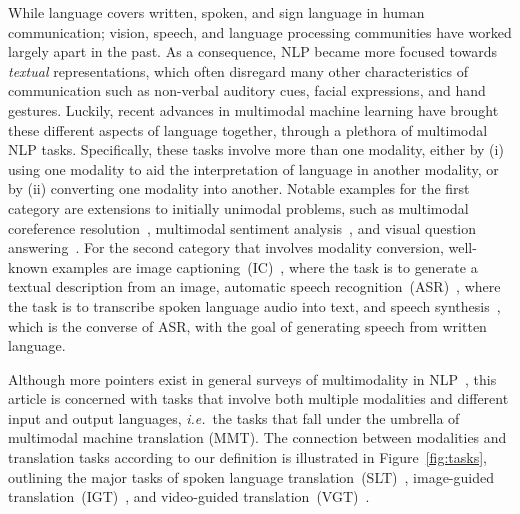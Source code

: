 \documentclass{svjour3}
\newcommand{\ie}[1]{\textit{i.e.}~#1}
\begin{document}
    While language covers written, spoken, and sign language in human communication; vision, speech, and language processing communities have worked largely apart in the past. As a consequence, NLP became more focused towards \emph{textual} representations, which often disregard many other characteristics of communication such as
    non-verbal auditory cues, facial expressions, and hand gestures.
    Luckily, recent advances in multimodal machine learning have brought these different aspects of language together, through a plethora of multimodal NLP tasks.
    Specifically, these tasks involve more than one modality, either by (i) using one modality to aid the interpretation of language in another modality, or by (ii) converting one modality into another. Notable examples for the first category are extensions to initially unimodal problems, such as multimodal coreference resolution~\citep{ramanathan2014linking}, multimodal sentiment analysis~\citep{zadeh2016mosi}, and visual question answering~\citep{antol2015vqa}.
    For the second category that involves modality conversion, well-known examples are image captioning~(IC)~\citep{bernardi2016automatic}, where the task is to generate a textual description from an image, automatic speech recognition~(ASR)~\citep{yu2016automatic}, where the task is to transcribe spoken language audio into text, and speech synthesis~\citep{ling2015deep}, which is the converse of ASR, with the goal of generating speech from written language.
    
    Although more pointers exist in general surveys of multimodality in NLP~\citep{bernardi2016automatic, baltrusaitis-multimodal-2017,kafle2017visual,mogadala-trends-2019},
    this article is concerned with tasks that involve both multiple modalities and different input and output languages, \ie{}the tasks that fall under the umbrella of multimodal machine translation (MMT).
    The connection between modalities and translation tasks according to our definition is illustrated in Figure~\ref{fig:tasks},
    outlining the major tasks of spoken language translation~(SLT)~\citep{akiba-overview-2004}, image-guided translation~(IGT)~\citep{elliott2015multi,specia-shared-2016}, and video-guided translation~(VGT)~\citep{sanabria-how2:-2018,wang-vatex-2019}.
    
\end{document}
